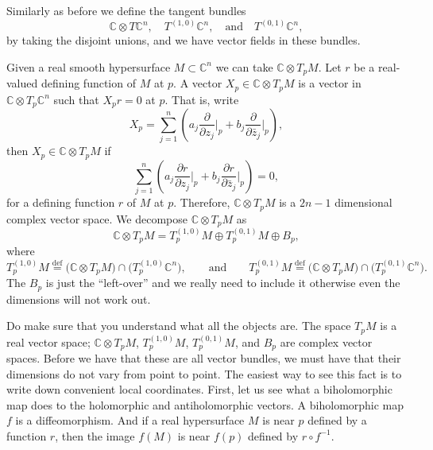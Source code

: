\documentclass[12pt,openany]{book}
\newcommand{\C}{{\mathbb{C}}}
\theoremstyle{plain}
\theoremstyle{remark}
\theoremstyle{definition}
\theoremstyle{exercise}
\theoremstyle{example}
\begin{document}
Similarly as before we define the tangent bundles
\begin{equation*}
\C \otimes T\C^n,
\quad
T^{(1,0)} \C^n,
\quad \text{and} \quad
T^{(0,1)} \C^n ,
\end{equation*}
by taking the disjoint unions, and we have vector fields in these bundles.

Given a real smooth hypersurface $M \subset \C^n$ we can take
$\C \otimes T_pM$.  Let $r$ be a real-valued defining function of
$M$ at $p$.  A vector $X_p \in \C \otimes T_pM$
is a vector in $\C \otimes T_p\C^n$ such that $X_p r = 0$ at $p$.  That is,
write
\begin{equation*}
X_p = \sum_{j=1}^n
\left(
a_j 
\frac{\partial}{\partial z_j} \Big|_p
+
b_j
\frac{\partial}{\partial \bar{z}_j} \Big|_p
\right),
\end{equation*}
then $X_p \in \C \otimes T_p M$
if
\begin{equation*}
 \sum_{j=1}^n
\left(
a_j 
\frac{\partial r}{\partial z_j} \Big|_p
+
b_j
\frac{\partial r}{\partial \bar{z}_j} \Big|_p
\right)
= 0 ,
\end{equation*}
for a defining function $r$ of $M$ at $p$.
Therefore, $\C \otimes T_p M$ is a $2n-1$ dimensional complex vector space.
We decompose 
$\C \otimes T_p M$ as
\begin{equation*}
\C \otimes T_pM = 
T_p^{(1,0)} M \oplus T_p^{(0,1)} M \oplus B_p ,
\end{equation*}
where
\begin{equation*}
T_p^{(1,0)} M \overset{\text{def}}{=} \bigl( \C \otimes T_pM \bigr) \cap
\bigl( T_p^{(1,0)} \C^n \bigr),  \qquad \text{and}
\qquad
T_p^{(0,1)} M \overset{\text{def}}{=} \bigl( \C \otimes T_pM \bigr) \cap
\bigl( T_p^{(0,1)} \C^n \bigr) .
\end{equation*}
The $B_p$ is just the ``left-over'' and we really need to
include it otherwise even the dimensions will not work out.

Do make sure that you understand what all the objects are.  The space
$T_pM$ is a real vector space; $\C \otimes T_pM$, $T_p^{(1,0)}M$,
$T_p^{(0,1)} M$, and $B_p$ are complex vector spaces.  Before we have that
these are all vector bundles, we must have that their dimensions do not vary
from point to point.  The easiest way to see this fact is to write down
convenient local coordinates.  First, let us see what a biholomorphic map
does to the holomorphic and antiholomorphic vectors.  A biholomorphic map
$f$ is a diffeomorphism.  And if a real hypersurface $M$ is near $p$ defined
by a function $r$, then the image $f(M)$ is near $f(p)$ defined by
$r \circ f^{-1}$.
\end{document}
